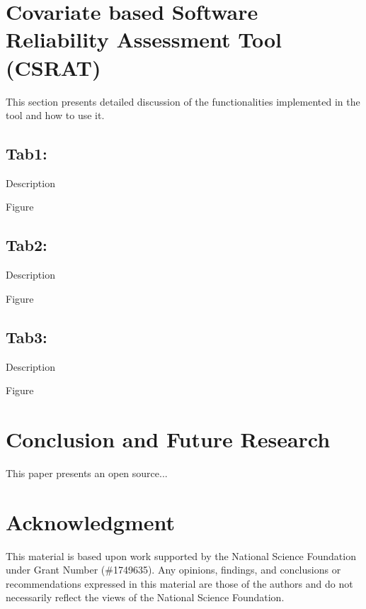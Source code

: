 \documentclass[conference]{IEEEtran}
\begin{document}
\section{Covariate based Software Reliability Assessment Tool (CSRAT)}\label{sec:SRAT}
This section presents detailed discussion of the functionalities implemented in the tool and how to use it.

\subsection{Tab1: }\label{sec:Tab1}
Description

Figure 



\subsection{Tab2: }\label{sec:Tab2}
Description

Figure 

\subsection{Tab3: }\label{sec:Tab3}
Description

Figure 

\section{Conclusion and Future Research}\label{sec:Concl}
This paper presents an open source...

\section*{Acknowledgment}
This material is based upon work supported by the National Science Foundation under Grant Number (\#1749635). Any opinions, findings, and conclusions or recommendations expressed in this material are those of the authors and do not necessarily reflect the views of the National Science Foundation.



\end{document}
